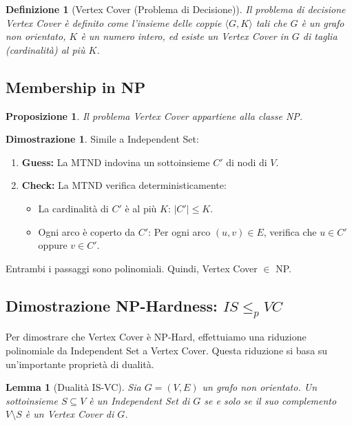 \documentclass[a4paper]{article}
\newtheorem{definition}{Definizione}[section]
\newtheorem{lemma}{Lemma}[section]
\newtheorem{proposition}{Proposizione}[section]
\theoremstyle{definition} %
\newtheorem*{proof*}{Dimostrazione}
\begin{document}
\begin{definition}[Vertex Cover (Problema di Decisione)]
Il problema di decisione \emph{Vertex Cover} è definito come l'insieme delle coppie $\langle G, K \rangle$ tali che $G$ è un grafo non orientato, $K$ è un numero intero, ed esiste un Vertex Cover in $G$ di taglia (cardinalità) al più $K$.
\end{definition}

\subsection{Membership in NP}

\begin{proposition}
Il problema \emph{Vertex Cover} appartiene alla classe NP.
\end{proposition}

\begin{proof*}
Simile a Independent Set:
\begin{enumerate}
    \item \textbf{Guess:} La MTND indovina un sottoinsieme $C'$ di nodi di $V$.
    \item \textbf{Check:} La MTND verifica deterministicamente:
    \begin{itemize}
        \item La cardinalità di $C'$ è al più $K$: $|C'| \le K$.
        \item Ogni arco è coperto da $C'$: Per ogni arco $(u, v) \in E$, verifica che $u \in C'$ oppure $v \in C'$.
    \end{itemize}
\end{enumerate}
Entrambi i passaggi sono polinomiali. Quindi, Vertex Cover $\in$ NP.
\end{proof*}

\subsection{Dimostrazione NP-Hardness: $IS \le_p VC$}

Per dimostrare che Vertex Cover è NP-Hard, effettuiamo una riduzione polinomiale da Independent Set a Vertex Cover. Questa riduzione si basa su un'importante proprietà di dualità.

\begin{lemma}[Dualità IS-VC]
Sia $G=(V, E)$ un grafo non orientato. Un sottoinsieme $S \subseteq V$ è un Independent Set di $G$ se e solo se il suo complemento $V \setminus S$ è un Vertex Cover di $G$.
\end{lemma}
\end{document}
